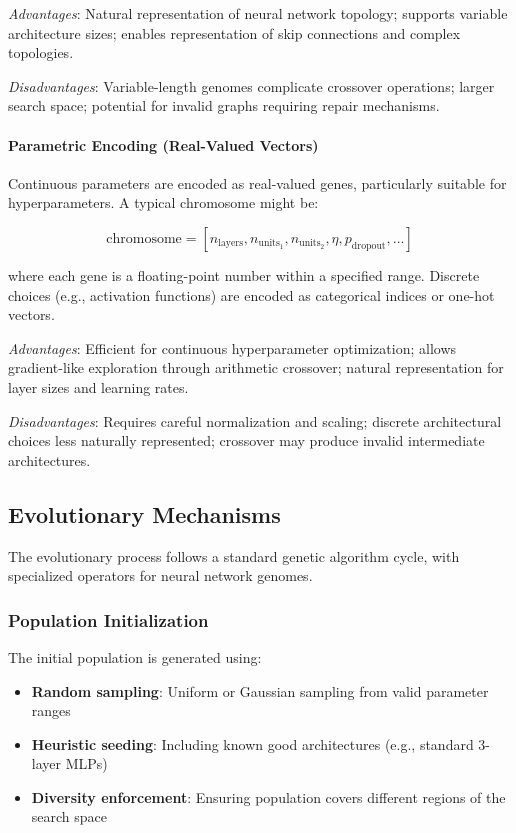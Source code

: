 \textit{Advantages}: Natural representation of neural network topology; supports variable architecture sizes; enables representation of skip connections and complex topologies.

\textit{Disadvantages}: Variable-length genomes complicate crossover operations; larger search space; potential for invalid graphs requiring repair mechanisms.

\paragraph{Parametric Encoding (Real-Valued Vectors)}
Continuous parameters are encoded as real-valued genes, particularly suitable for hyperparameters. A typical chromosome might be:

\begin{equation}
\text{chromosome} = [n_{\text{layers}}, n_{\text{units}_1}, n_{\text{units}_2}, \eta, p_{\text{dropout}}, \ldots]
\end{equation}

where each gene is a floating-point number within a specified range. Discrete choices (e.g., activation functions) are encoded as categorical indices or one-hot vectors.

\textit{Advantages}: Efficient for continuous hyperparameter optimization; allows gradient-like exploration through arithmetic crossover; natural representation for layer sizes and learning rates.

\textit{Disadvantages}: Requires careful normalization and scaling; discrete architectural choices less naturally represented; crossover may produce invalid intermediate architectures.

\subsection{Evolutionary Mechanisms}
\label{subsec:evolutionary_mechanisms}

The evolutionary process follows a standard genetic algorithm cycle, with specialized operators for neural network genomes.

\subsubsection{Population Initialization}

The initial population is generated using:
\begin{itemize}
    \item \textbf{Random sampling}: Uniform or Gaussian sampling from valid parameter ranges
    \item \textbf{Heuristic seeding}: Including known good architectures (e.g., standard 3-layer MLPs)
    \item \textbf{Diversity enforcement}: Ensuring population covers different regions of the search space
\end{itemize}

